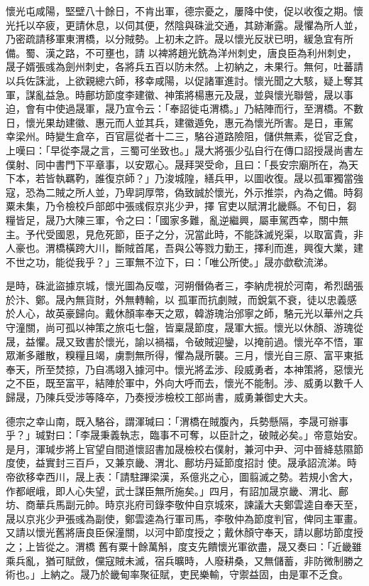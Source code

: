 \begin{pinyinscope}
 懷光屯咸陽，堅壁八十餘日，不肯出軍，德宗憂之，屢降中使，促以收復之期。懷光托以卒疲，更請休息，以伺其便，然陰與硃泚交通，其跡漸露。晟懼為所人並，乃密疏請移軍東渭橋，以分賊勢。上初未之許。晟以懷光反狀已明，緩急宜有所備。蜀、漢之路，不可壅也，請
 以裨將趙光銑為洋州刺史，唐良臣為利州刺史，晟子婿張彧為劍州刺史，各將兵五百以防未然。上初納之，未果行。無何，吐蕃請以兵佐誅泚，上欲親總六師，移幸咸陽，以促諸軍進討。懷光聞之大駭，疑上奪其軍，謀亂益急。時鄜坊節度李建徽、神策將楊惠元及晟，並與懷光聯營，晟以事迫，會有中使過晟軍，晟乃宣令云：「奉詔徙屯渭橋。」乃結陣而行，至渭橋。不數日，懷光果劫建徽、惠元而人並其兵，建徽遁免，惠元為懷光所害。是日，車駕
 幸梁州。時變生倉卒，百官扈從者十二三，駱谷道路險阻，儲供無素，從官乏食，上嘆曰：「早從李晟之言，三蜀可坐致也。」晟大將張少弘自行在傳口詔授晟尚書左僕射、同中書門下平章事，以安眾心。晟拜哭受命，且曰：「長安宗廟所在，為天下本，若皆執羈靮，誰復京師？」乃浚城隍，繕兵甲，以圖收復。晟以孤軍獨當強寇，恐為二賊之所人並，乃卑詞厚幣，偽致誠於懷光，外示推崇，內為之備。時芻粟未集，乃令檢校戶部郎中張彧假京兆少尹，擇
 官吏以賦渭北畿縣。不旬日，芻糧皆足，晟乃大陳三軍，令之曰：「國家多難，亂逆繼興，屬車駕西幸，關中無主。予代受國恩，見危死節，臣子之分，況當此時，不能誅滅兇渠，以取富貴，非人豪也。渭橋橫跨大川，斷賊首尾，吾與公等戮力勤王，擇利而進，興復大業，建不世之功，能從我乎？」三軍無不泣下，曰：「唯公所使。」晟亦歔欷流涕。



 是時，硃泚盜據京城，懷光圖為反噬，河朔僭偽者三，李納虎視於河南，希烈鴟張於汴、鄭。晟內無貨財，外無轉輸，以
 孤軍而抗劇賊，而銳氣不衰，徒以忠義感於人心，故英豪歸向。戴休顏率奉天之眾，韓游瑰治邠寧之師，駱元光以華州之兵守潼關，尚可孤以神策之旅屯七盤，皆稟晟節度，晟軍大振。懷光以休顏、游瑰從晟，益懼。晟又致書於懷光，諭以禍福，令破賊迎鑾，以掩前過。懷光卒不悟，軍眾漸多離散，糗糧且竭，虜剽無所得，懼為晟所襲。三月，懷光自三原、富平東抵奉天，所至焚掠，乃自馮翊入據河中。懷光將孟涉、段威勇者，本神策將，惡懷光
 之不臣，既至富平，結陣於軍中，外向大呼而去，懷光不能制。涉、威勇以數千人歸晟，乃陳兵受涉等降卒，乃奏授涉檢校工部尚書，威勇兼御史大夫。



 德宗之幸山南，既入駱谷，謂渾瑊曰：「渭橋在賊腹內，兵勢懸隔，李晟可辦事乎？」瑊對曰：「李晟秉義執志，臨事不可奪，以臣計之，破賊必矣。」帝意始安。是月，渾瑊步將上官望自間道懷詔書加晟檢校右僕射，兼河中尹、河中晉絳慈隰節度使，益實封三百戶，又兼京畿、渭北、鄜坊丹延節度招討
 使。晟承詔流涕。時帝欲移幸西川，晟上表：「請駐蹕梁漢，系億兆之心，圖翦滅之勢。若規小舍大，作都岷峨，即人心失望，武士謀臣無所施矣。」四月，有詔加晟京畿、渭北、鄜坊、商華兵馬副元帥。時京兆府司錄李敬仲自京城來，諫議大夫鄭雲逵自奉天至，晟以京兆少尹張彧為副使，鄭雲逵為行軍司馬，李敬仲為節度判官，俾同主軍畫。又請以懷光舊將唐良臣保潼關，以河中節度授之；戴休顏守奉天，請以鄜坊節度授之；上皆從之。渭橋
 舊有粟十餘萬斛，度支先饋懷光軍欲盡，晟又奏曰：「近畿雖乘兵亂，猶可賦斂，儻寇賊未滅，宿兵曠時，人廢耕桑，又無儲蓄，非防微制勝之術也。」上納之。晟乃於畿甸率聚征賦，吏民樂輸，守禦益固，由是軍不乏食。




\end{pinyinscope}
